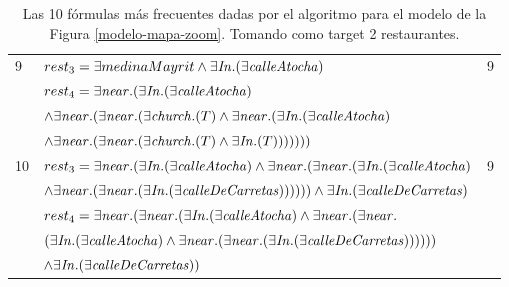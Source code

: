 \begin{table}[h]
\begin{center}
\begin{tabular}{|l|l|c|}
9&$rest_3 =\exists medinaMayrit \land \exists \mathit{In}.(\exists \mathit{calleAtocha})$ & 9\\
&$rest_4 = \exists \mathit{near}.(\exists \mathit{In}.(\exists \mathit{calleAtocha}) $ & \\
&$ \land \exists \mathit{near}.(\exists \mathit{near}.(\exists \mathit{church}.(T)  \land \exists \mathit{near}.(\exists \mathit{In}.(\exists \mathit{calleAtocha})  $ & \\
&$\land \exists \mathit{near}.(\exists \mathit{near}.(\exists \mathit{church}.(T)  \land \exists \mathit{In}.(T)))))))$&\\ \hline

10&$rest_3 = \exists \mathit{near}.(\exists \mathit{In}.(\exists \mathit{calleAtocha})  \land \exists \mathit{near}.(\exists \mathit{near}.(\exists \mathit{In}.(\exists \mathit{calleAtocha}) $ & 9\\
&$ \land \exists \mathit{near}.(\exists \mathit{near}.(\exists \mathit{In}.(\exists \mathit{calleDeCarretas}))))))  \land \exists \mathit{In}.(\exists \mathit{calleDeCarretas})  $ & \\
&$rest_4 = \exists \mathit{near}.(\exists \mathit{near}.(\exists \mathit{In}.(\exists \mathit{calleAtocha})  \land \exists \mathit{near}.(\exists \mathit{near}.$ & \\
&$(\exists \mathit{In}.(\exists \mathit{calleAtocha})  \land \exists \mathit{near}.(\exists \mathit{near}.(\exists \mathit{In}.(\exists \mathit{calleDeCarretas})))))) $ & \\
&$ \land \exists \mathit{In}.(\exists \mathit{calleDeCarretas}))$&\\ \hline

\end{tabular}

\caption{Las 10 f\'ormulas m\'as frecuentes dadas por el algoritmo para el modelo de la Figura \protect\ref{modelo-mapa-zoom}. Tomando como target 2 restaurantes.}\label{formulas-mapa-zoom2-apendice}
\end{center}
\end{table}



